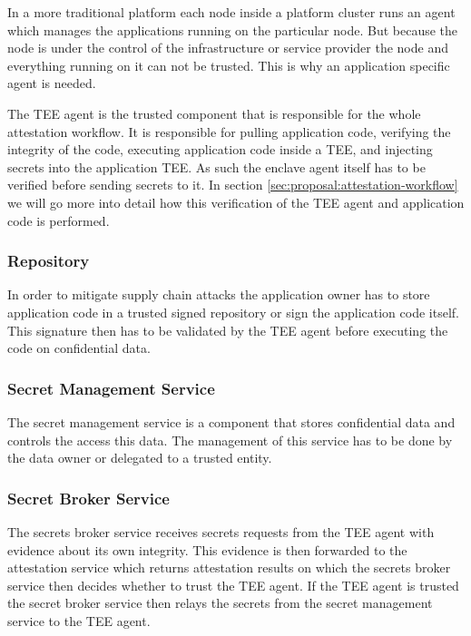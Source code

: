 In a more traditional platform each node inside a platform cluster runs an agent
which manages the applications running on the particular node. But because the
node is under the control of the infrastructure or service provider the node and
everything running on it can not be trusted. This is why an application specific
agent is needed.

The TEE agent is the trusted component that is responsible for the whole
attestation workflow. It is responsible for pulling application code, verifying
the integrity of the code, executing application code inside a TEE, and
injecting secrets into the application TEE. As such the enclave agent itself has
to be verified before sending secrets to it. In section
\ref{sec:proposal:attestation-workflow} we will go more into detail how this
verification of the TEE agent and application code is performed.

\subsubsection{Repository}

In order to mitigate supply chain attacks the application owner has to store
application code in a trusted signed repository or sign the application code
itself. This signature then has to be validated by the TEE agent before
executing the code on confidential data.

\subsubsection{Secret Management Service}

The secret management service is a component that stores confidential data and
controls the access this data. The management of this service has to be done by
the data owner or delegated to a trusted entity.

\subsubsection{Secret Broker Service}

The secrets broker service receives secrets requests from the TEE agent with
evidence about its own integrity. This evidence is then forwarded to the
attestation service which returns attestation results on which the secrets
broker service then decides whether to trust the TEE agent. If the TEE agent is
trusted the secret broker service then relays the secrets from the secret
management service to the TEE agent.

